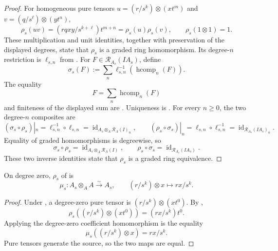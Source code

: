 \begin{proof}
  For homogeneous pure tensors
  $u=(r/s^k)\otimes(xt^m)$ and
  $v=(q/s^\ell)\otimes(yt^n)$,
  \[
    \rho_s(uv)
      =(rqxy/s^{k+\ell})t^{m+n}
      =\rho_s(u)\rho_s(v),
    \qquad \rho_s(1\otimes1)=1.
  \]
  These multiplication and unit identities, together with preservation of
  the displayed degrees, state that $\rho_s$ is a graded ring homomorphism.
  Its degree-$n$ restriction is
  $\ell_{s,n}$ from .  For
  $F\in\mathcal R_{A_s}(IA_s)$, define
  \[
    \sigma_s(F):=
      \sum_n\ell_{s,n}^{-1}(\operatorname{hcomp}_n(F)).
  \]
  The equality
  \[
    F=\sum_n\operatorname{hcomp}_n(F)
  \]
  and finiteness of the displayed sum are
  .
  Uniqueness is .  For every
  $n\geq0$, the two degree-$n$ composites are
  \[
    (\sigma_s\circ\rho_s)|_n
      =\ell_{s,n}^{-1}\circ\ell_{s,n}
      =\operatorname{id}_{A_s\otimes_A\mathcal R_A(I)_n},
    \qquad
    (\rho_s\circ\sigma_s)|_n
      =\ell_{s,n}\circ\ell_{s,n}^{-1}
      =\operatorname{id}_{\mathcal R_{A_s}(IA_s)_n}.
  \]
  Equality of graded homomorphisms is degreewise, so
  \[
    \sigma_s\circ\rho_s
      =\operatorname{id}_{A_s\otimes_A\mathcal R_A(I)},
    \qquad
    \rho_s\circ\sigma_s
      =\operatorname{id}_{\mathcal R_{A_s}(IA_s)}.
  \]
  These two inverse identities state that $\rho_s$ is a graded ring
  equivalence.
\end{proof}

\begin{lemma}
  \label{lemma:nagata-rees-localization-degree-zero}

  On degree zero, $\rho_s$ of  is
  \[
    \mu_s\colon A_s\otimes_AA\xrightarrow{\sim}A_s,
    \qquad (r/s^k)\otimes x\longmapsto rx/s^k.
  \]
\end{lemma}

\begin{proof}
  Under , a degree-zero pure tensor is
  $(r/s^k)\otimes(xt^0)$.  By
  ,
  \[
    \rho_s((r/s^k)\otimes(xt^0))=(rx/s^k)t^0.
  \]
  Applying the degree-zero coefficient homomorphism is the equality
  \[
    \mu_s((r/s^k)\otimes x)=rx/s^k.
  \]
  Pure tensors generate the source, so
  the two maps are equal.
\end{proof}

